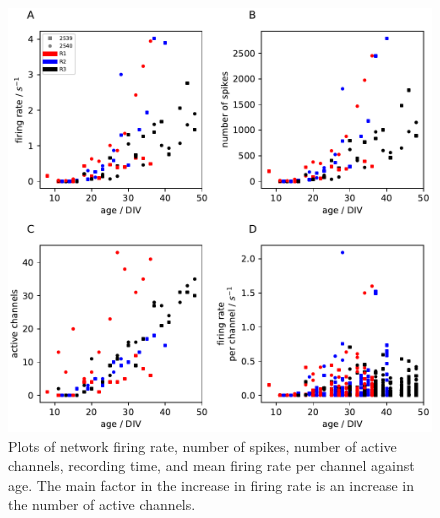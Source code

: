 \documentclass{bmcart}
\begin{document}
\begin{backmatter}
\begin{figure}[h!]
    \includegraphics{../plots/development_plots.pdf}
	\caption{Plots of network firing rate, number of spikes, number of active channels, recording time, and mean firing rate per channel against age. The main factor in the increase in firing rate is an increase in the number of active channels.}
	\label{fig:development}
\end{figure}


\end{backmatter}
\end{document}
